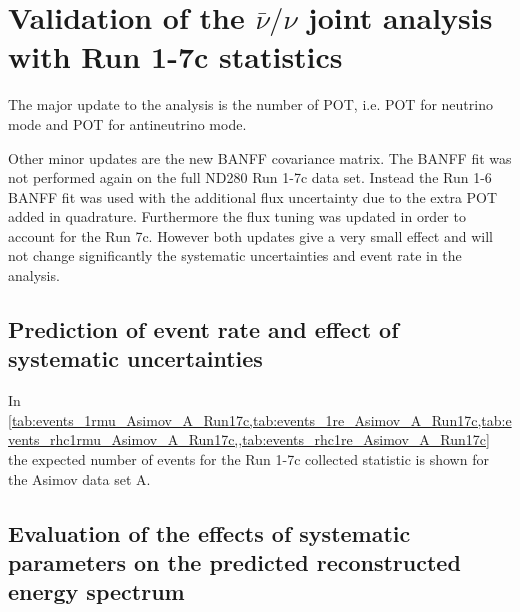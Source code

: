 \clearpage


\section{Validation of the $\bar{\nu}/\nu$ joint analysis with Run 1-7c statistics}
\label{sec:validation}

The major update to the analysis is the number of POT, 
i.e. 
\TotalPotNuRunOneSevenC{} POT for neutrino mode
and
\TotalPotNuBarRunOneSevenC{} POT for antineutrino mode. 

Other minor updates are the new BANFF covariance matrix.
The BANFF fit was not performed again on the full ND280 Run 1-7c data set. Instead the Run 1-6
BANFF fit was used with the additional flux uncertainty due to the extra POT added in quadrature. 
Furthermore the flux tuning was updated in order to account for the Run 7c.
However both updates give a very small effect and will not change significantly the systematic
uncertainties and event rate in the analysis.

%
%

\subsection{Prediction of event rate and effect of systematic uncertainties}
\label{sec:event_rate_syst_run17c}




In \cref{tab:events_1rmu_Asimov_A_Run17c,tab:events_1re_Asimov_A_Run17c,tab:events_rhc1rmu_Asimov_A_Run17c,,tab:events_rhc1re_Asimov_A_Run17c} 
the expected number of events for the Run 1-7c collected statistic is shown for the Asimov data set A.







\clearpage

\subsection {Evaluation of the effects of systematic parameters on the predicted reconstructed energy spectrum}
\label{sec:systematics:evaluation}


